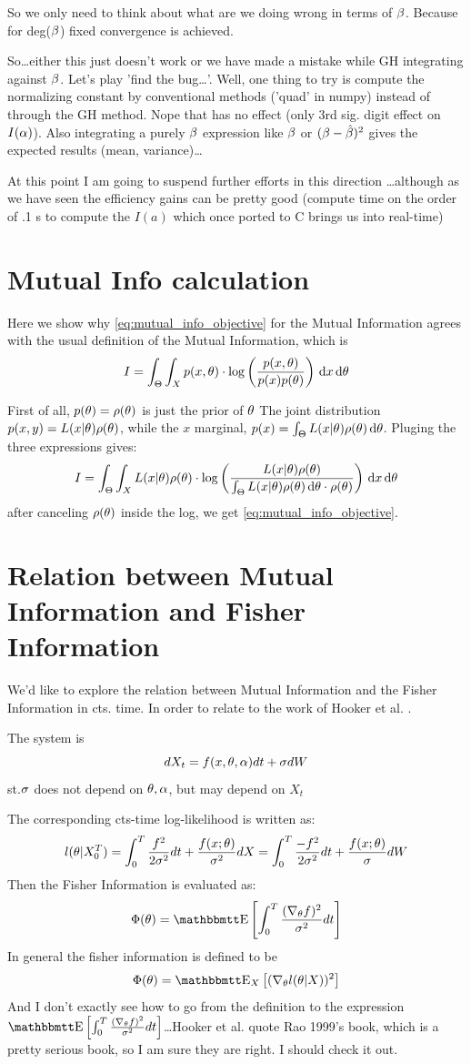 \documentclass{article}
\begin{document}
So we only need to think about what are we doing wrong in terms of ${\beta}$. Because
for deg(${\beta}$) fixed convergence is achieved. 

So\ldots either this just doesn't work or we have made a mistake while
GH integrating against ${\beta}$. Let's play 'find the bug\ldots'. Well, one thing to
try is compute the normalizing constant by conventional methods ('quad' in
numpy) instead of through the GH method. Nope that has no effect (only 3rd sig.
digit effect on $I({\alpha})$). 
Also integrating a purely ${\beta}$ expression like ${\beta}$ or $({\beta}-\hat {{\beta}})^2$ gives
the expected results (mean, variance)\ldots

At this point I am going to suspend further efforts in this
direction \ldots although as we have seen the efficiency gains can be pretty
good (compute time on the order of .1 s to compute the $I(a)$ which once ported
to C brings us into real-time)


\clearpage
\appendix
\section{Mutual Info calculation}
Here we show why \cref{eq:mutual_info_objective} for the Mutual Information
agrees with the usual definition of the Mutual Information, which is 
$$
I = \int_\Theta \int_X p(x,{\theta}) \cdot \log \left(
\frac{p(x,{\theta})}{p(x)p({\theta})}\right) \, \mathrm{d} x \, \mathrm{d} {\theta}$$

First of all, $p({\theta}) = \rho({\theta})$ is just the prior of ${\theta}$
The joint distribution $p(x,y) = L(x|{\theta})\rho({\theta})$, while the $x$ marginal, 
$p(x) = \int_\Theta L(x|{\theta})\rho({\theta}) \, \mathrm{d} {\theta}$.
Pluging the three expressions gives:
$$
I = \int_\Theta \int_X L(x|{\theta})\rho({\theta}) \cdot 
\log \left( \frac{L(x|{\theta})\rho({\theta}) }{\int_\Theta L(x|{\theta})\rho({\theta}) \, \mathrm{d} {\theta}
\cdot \rho({\theta}) } \right)
\, \mathrm{d} x\, \mathrm{d} {\theta}
$$
after canceling $\rho({\theta})$ inside the log, we get \cref{eq:mutual_info_objective}.

\section{Relation between Mutual Information and Fisher Information}
We'd like to explore the relation between Mutual Information and the Fisher
Information in cts. time. In order to relate to the work of Hooker et al.
\cite{Lin}. 

The system is 
$$
dX_t = f(x, {\theta}, {\alpha}) dt + {\sigma } dW
$$
st.${\sigma }$ does not depend on ${\theta}, {\alpha}$, but may depend on $X_t$

The corresponding cts-time log-likelihood is written as:
$$
l( {\theta}| X_0^T ) 
= \int_0^T \frac{f^2}{2{\sigma }^2} dt + \frac{f(x;{\theta})}{{\sigma }^2} dX 
= \int_0^T \frac{-f^2}{2{\sigma }^2} dt + \frac{f(x;{\theta})}{{\sigma }} dW $$ 
Then the Fisher Information is evaluated as:
$$
\FI(\th) = \Exp\left[ \int_0^T \frac {(\grad_\th f)^2} {\s^2} dt\right]  
$$
In general the fisher information is defined to be
$$
\FI(\th) = \Exp_X\left[ (\grad_\th l(\th|X))^2 \right]
$$ And I don't exactly see how to go from the definition to the expression
$\Exp\left[ \int_0^T \frac {(\grad_\th f)^2} {\s^2} dt\right]$\ldots Hooker et
al. quote Rao 1999's book, which is a pretty serious book, so I am sure they are
right. I should check it out. 
\end{document}
